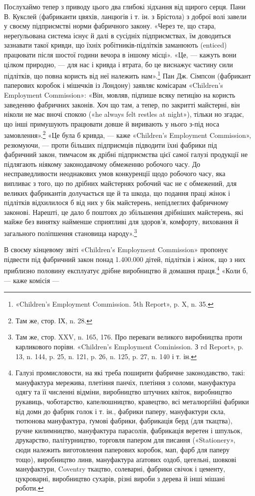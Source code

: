 \parcont{}  %
Послухаймо тепер з приводу цього два глибокі зідхання від щирого серця. Пани
В. Кукслей (фабриканти цвяхів, ланцюгів і т. ін. з Брістола) з доброї волі
завели у своєму підприємстві норми фабричного
закону. «Через те, що стара, нереґульована система існує й далі в сусідніх
підприємствах, їм доводиться зазнавати такої кривди, що їхніх
робітників-підлітків заманюють (enticed) працювати після
шостої години вечора в іншому місці». «Це, — кажуть вони цілком природно, — для
нас і кривда і втрата, бо це виснажує частину сили підлітків, що повна користь
від неї належить нам».\footnote{
«Children's Employment Commission. 5th Report», p. X, n. 35.
} Пан Дж. Сімпсон (фабрикант паперових коробок і мішечків із Лондону) заявляє
комісарам «Children’s Employment Commission»: «Він, мовляв, підпише всяку
петицію на користь заведенню фабричних законів. Хоч що там,
а тепер, по закритті майстерні, він ніколи не має вночі спокою («he always felt
restles at night»), тільки но згадає, що інші примушують працювати довше й
виривають у нього з-під носа замовлення».\footnote{
Там же, стор. ІХ, n. 28.
}
«Це була б кривда, — каже «Children’s Employment Commission», резюмуючи, —
проти більших підприємців підводити їхні фабрики під фабричний закон, тимчасом
як дрібні підприємства цієї самої галузі
продукції не підлягають ніякому законодавчому обмеженню робочого часу. До
несправедливости неоднакових умов конкуренції щодо робочого часу, яка випливає
з того, що по дрібних майстернях робочий час не є обмежений, для великих
фабрикантів долучається ще й та шкода, що подання праці
жінок і підлітків відхилилося б від них у бік майстерень, непідлеглих
фабричному законові. Нарешті, це дало б поштовх до збільшення дрібніших
майстерень, які майже без винятку найменше сприятливі для
здоров’я, комфорту, виховання й загального поліпшення становища народу».\footnote{
Там же, стор. XXV, n. 165, 176. Про переваги великого виробництва проти
карликового порівн. «Children’s Employment Cominission. З rd Report», p. 13,
n. 144, p. 25, n. 121, p. 26, n. 125, p. 27, n. 140 і т. ін.
}

В своєму кінцевому звіті «Children’s Employment Commission» пропонує підвести
під фабричний закон понад 1.400.000 дітей, підлітків і жінок, що з них
приблизно половину експлуатує дрібне виробництво
й домашня праця.\footnote{
Галузі промисловости, на які треба поширити фабричне законодавство, такі:
мануфактура мережива, плетіння панчіх, плетіння з соломи, мануфактура одягу
та її численні відміни, виробництво штучних квіток, виробництво рукавиць,
чоботарство, капелюшництво, кравецтво, всі металюрґійні
фабрики від домн до фабрик голок і т. ін., фабрики паперу, мануфактури скла,
тютюнова мануфактура, ґумові фабрики, фабрикація берд (для ткацтва), ручне
килимництво, мануфактура парасолів, фабрикація
веретен і шпульок, друкарство, палітурництво, торговля папером для писання
(«Stationery», сюди належить виготовлення паперових коробок, мап, фарб для
паперу тощо), виробництво линв, мануфактура
аґатових оздоб, цегельні, шовкові мануфактури, Coventry ткацтво, солеварні,
фабрики свічок і цементу, цукроварні, виробництво сухарів, різні вироби з
дерева й інші мішані роботи.
} «Коли б, — каже комісія —
\parbreak{}  %
